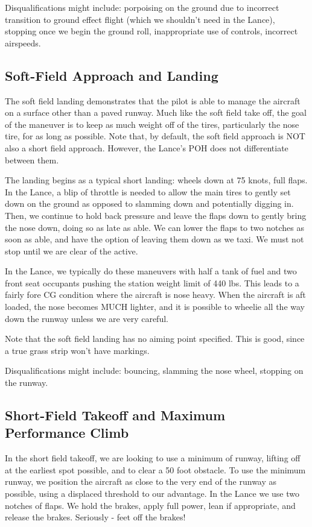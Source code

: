 Disqualifications might include: porpoising on the ground due to incorrect transition to ground effect flight (which we shouldn't need in the Lance), stopping once we begin the ground roll, inappropriate use of controls, incorrect airspeeds.

\subsection{Soft-Field Approach and Landing}

The soft field landing demonstrates that the pilot is able to manage the aircraft on a surface other than a paved runway. Much like the soft field take off, the goal of the maneuver is to keep as much weight off of the tires, particularly the nose tire, for as long as possible. Note that, by default, the soft field approach is NOT also a short field approach. However, the Lance's POH does not differentiate between them.

The landing begins as a typical short landing: wheels down at 75 knots, full flaps. In the Lance, a blip of throttle is needed to allow the main tires to gently set down on the ground as opposed to slamming down and potentially digging in. Then, we continue to hold back pressure and leave the flaps down to gently bring the nose down, doing so as late as able. We can lower the flaps to two notches as soon as able, and have the option of leaving them down as we taxi. We must not stop until we are clear of the active.

In the Lance, we typically do these maneuvers with half a tank of fuel and two front seat occupants pushing the station weight limit of 440 lbs. This leads to a fairly fore CG condition where the aircraft is nose heavy. When the aircraft is aft loaded, the nose becomes MUCH lighter, and it is possible to wheelie all the way down the runway unless we are very careful.

Note that the soft field landing has no aiming point specified. This is good, since a true grass strip won't have markings.

Disqualifications might include: bouncing, slamming the nose wheel, stopping on the runway.

\subsection{Short-Field Takeoff and Maximum Performance Climb}

In the short field takeoff, we are looking to use a minimum of runway, lifting off at the earliest spot possible, and to clear a 50 foot obstacle. To use the minimum runway, we position the aircraft as close to the very end of the runway as possible, using a displaced threshold to our advantage. In the Lance we use two notches of flaps. We hold the brakes, apply full power, lean if appropriate, and release the brakes. Seriously - feet off the brakes!

